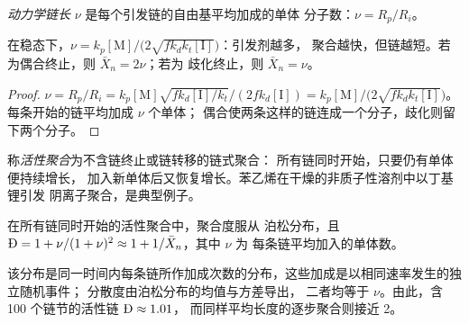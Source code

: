 \begin{definition}[动力学链长]\label{def:b2:polymer-synthesis:chain-length}
\emph{动力学链长} $\nu$ 是每个引发链的自由基平均加成的单体
分子数：$\nu = R_p/R_i$。
\end{definition}

\begin{proposition}[链长与引发剂]\label{prop:b2:polymer-synthesis:chain-length}
在稳态下，$\nu = k_p[\mathrm M]/\bigl(2\sqrt{fk_dk_t[\mathrm I]}\bigr)$：引发剂越多，
聚合越快，但链越短。若为偶合终止，则 $\bar X_n = 2\nu$；若为
歧化终止，则 $\bar X_n = \nu$。
\end{proposition}

\begin{proof}
$\nu = R_p/R_i = k_p[\mathrm M]\sqrt{fk_d[\mathrm I]/k_t}/(2fk_d[\mathrm I]) =
k_p[\mathrm M]/\bigl(2\sqrt{fk_dk_t[\mathrm I]}\bigr)$。每条开始的链平均加成 $\nu$ 个单体；
偶合使两条这样的链连成一个分子，歧化则留下两个分子。
\end{proof}

\begin{definition}[活性聚合]\label{def:b2:polymer-synthesis:living}
称\emph{活性聚合}为不含链终止或链转移的链式聚合：
所有链同时开始，只要仍有单体便持续增长，
加入新单体后又恢复增长。苯乙烯在干燥的非质子性溶剂中以丁基锂引发
阴离子聚合，是典型例子。
\end{definition}

\begin{proposition}[窄分布]\label{prop:b2:polymer-synthesis:living}
在所有链同时开始的活性聚合中，聚合度服从
泊松分布，且 $\text{\DH} = 1 + \nu/(1+\nu)^2 \approx 1 + 1/\bar X_n$，其中 $\nu$ 为
每条链平均加入的单体数。
\end{proposition}

\admitted

该分布是同一时间内每条链所作加成次数的分布，这些加成是以相同速率发生的独立随机事件；
分散度由泊松分布的均值与方差导出，
二者均等于 $\nu$。由此，含 100 个链节的活性链 $\text{\DH} \approx 1.01$，
而同样平均长度的逐步聚合则接近 2。

